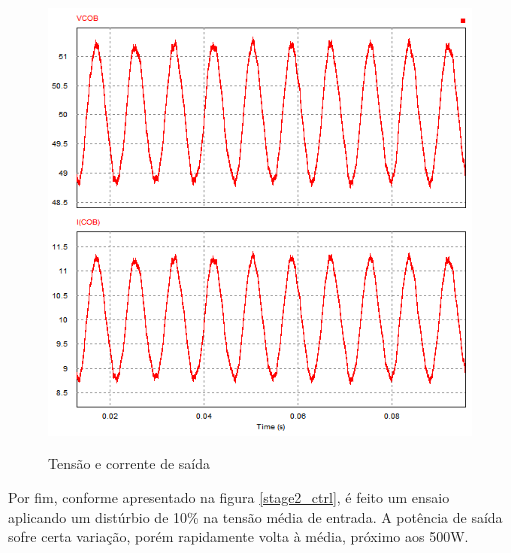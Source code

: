 \documentclass[
        12pt,
        openany, %
        oneside, %
        a4paper,			
        english,			
        brazil
        ]{abntbibufjf}
\begin{document}
\begin{figure}[!h]
	\centering
	\caption{Tensão e corrente de saída}
	\includegraphics[scale=.7]{../GRAFICOS/stage2_rip.PNG}\\
	\label{stage2_rip}
\end{figure}

Por fim, conforme apresentado na figura \ref{stage2_ctrl}, é feito um ensaio aplicando um distúrbio de 10\% na tensão média de entrada. A potência de saída sofre certa variação, porém rapidamente volta à média, próximo aos 500W.
\end{document}
